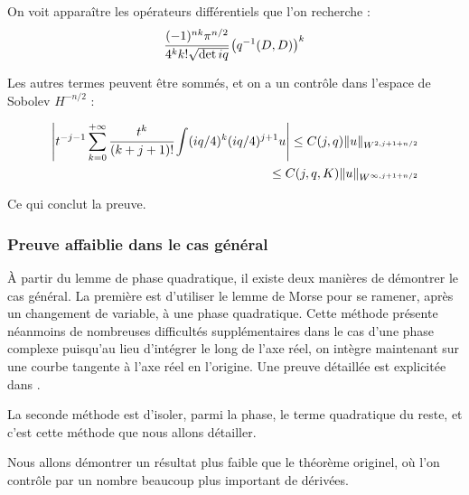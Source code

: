 On voit apparaître les opérateurs différentiels que l'on recherche :
\begin{equation}
\label{eq:coeffquad}
\cfrac{(-1)^{nk}\pi^{n/2}}{4^kk!\sqrt{\det{iq}}}\left(q^{-1}(D,D)\right)^k
\end{equation}

Les autres termes peuvent être sommés, et on a un contrôle dans l'espace de Sobolev $H^{-n/2}$ :

\begin{align*}
	\left|t^{-j-1}\sum_{k=0}^{+\infty}\cfrac{t^k}{(k+j+1)!}\int (iq/4)^k(iq/4)^{j+1}u\right| \leq C(j,q)\|u\|_{W^{2,j+1+n/2}}\\
	\leq C(j,q,K)\|u\|_{W^{\infty,j+1+n/2}}
\end{align*}

Ce qui conclut la preuve.

\subsubsection{Preuve affaiblie dans le cas général}
À partir du lemme de phase quadratique, il existe deux manières de démontrer le cas général. La première est d'utiliser le lemme de Morse pour se ramener, après un changement de variable, à une phase quadratique. Cette méthode présente néanmoins de nombreuses difficultés supplémentaires dans le cas d'une phase complexe puisqu'au lieu d'intégrer le long de l'axe réel, on intègre maintenant sur une courbe tangente à l'axe réel en l'origine. Une preuve détaillée est explicitée dans \cite{melin1975fourier}.

La seconde méthode est d'isoler, parmi la phase, le terme quadratique du reste, et c'est cette méthode que nous allons détailler. 

Nous allons démontrer un résultat plus faible que le théorème originel, où l'on contrôle par un nombre beaucoup plus important de dérivées.

